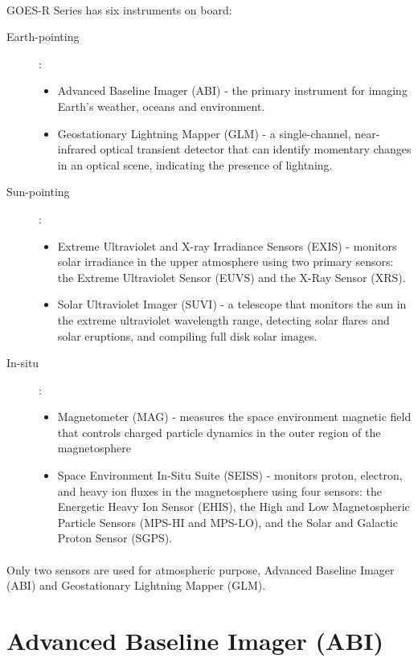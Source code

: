 \paragraph{}
GOES-R Series has six instruments on board:
\begin{description}
\item[Earth-pointing] : 
\begin{itemize} 
\item Advanced Baseline Imager (ABI) - the primary instrument for imaging Earth’s weather, oceans and environment.
\item Geostationary Lightning Mapper (GLM) - a single-channel, near-infrared optical transient detector that can identify momentary changes in an optical scene, indicating the presence of lightning.
\end{itemize}
\item[Sun-pointing] : 
\begin{itemize} 
\item Extreme Ultraviolet and X-ray Irradiance Sensors (EXIS) - monitors solar irradiance in the upper atmosphere using two primary sensors: the Extreme Ultraviolet Sensor (EUVS) and the X-Ray Sensor (XRS).
\item  Solar Ultraviolet Imager (SUVI) - a telescope that monitors the sun in the extreme ultraviolet wavelength range, detecting solar flares and solar eruptions, and compiling full disk solar images.
\end{itemize}
\item[In-situ] : 
\begin{itemize} 
\item Magnetometer (MAG) - measures the space environment magnetic field that controls charged particle dynamics in the outer region of the magnetosphere
\item Space Environment In-Situ Suite (SEISS) - monitors proton, electron, and heavy ion fluxes in the magnetosphere using four sensors: the Energetic Heavy Ion Sensor (EHIS), the High and Low Magnetospheric Particle Sensors (MPS-HI and MPS-LO), and the Solar and Galactic Proton Sensor (SGPS).
\end{itemize}
\end{description}
\paragraph{}
Only two sensors are used for atmospheric purpose, Advanced Baseline Imager (ABI) and Geostationary Lightning Mapper (GLM).
\section{Advanced Baseline Imager (ABI)}

